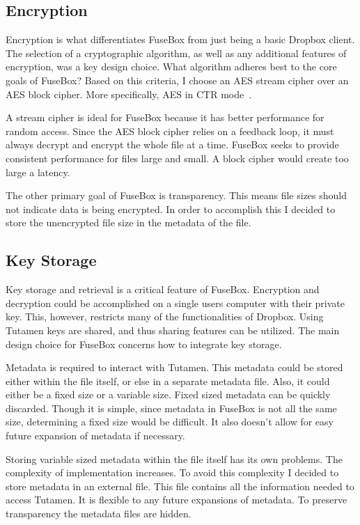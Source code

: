 \documentclass[11pt,twocolumn,letterpaper]{article}
\newcommand{\appname}{FuseBox }
\newcommand{\appnameWOspace}{FuseBox}
\newcommand{\custos}{Tutamen }
\newcommand{\custosWOspace}{Tutamen}
\begin{document}
\subsection{Encryption}
\label{sec:enc}
Encryption is what differentiates \appname from just being a basic
Dropbox client. The selection of a cryptographic algorithm, as well as
any additional features of encryption, was a key design choice. What
algorithm adheres best to the core goals of \appnameWOspace? Based on
this criteria, I choose an AES stream cipher over an AES block
cipher. More specifically, AES in CTR mode~\cite{AESCTR}.  
\par A stream cipher is ideal for \appname because it has better
performance for random access. Since the AES block 
cipher relies on a feedback loop, it must always decrypt and encrypt
the whole file at a time. \appname seeks to provide consistent
performance for files large and small. A block cipher would create
too large a latency.   
\par The other primary goal of \appname is transparency. This means
file sizes should not indicate data is being encrypted. In order to
accomplish this I decided to store the unencrypted file size in the
metadata of the file. 

\subsection{Key Storage}
\label{sec:keystorage}
Key storage and retrieval is a critical feature of \appnameWOspace. 
Encryption and decryption could be accomplished on a single users
computer with their private key. This, however, restricts many of the
functionalities of Dropbox. Using \custos keys are shared, and thus 
sharing features can be utilized. The main design choice for \appname
concerns how to integrate key storage.  
\par Metadata is required to interact with \custosWOspace. This
metadata could be stored either within the file itself, or else in a
separate metadata file. Also, it could either be a fixed size or a
variable size. Fixed sized metadata can be quickly discarded. Though
it is simple, since metadata in \appname is not all the same size,
determining a fixed size would be difficult. It also doesn't allow for
easy future expansion of metadata if necessary. 
\par Storing variable sized metadata within the file itself has its
own problems. The complexity of implementation increases. To avoid
this complexity I decided to store metadata in an external file. This
file contains all the information needed to access \custosWOspace. It
is flexible to any future expansions of metadata. 
To preserve transparency the metadata files are hidden. 
\end{document}
